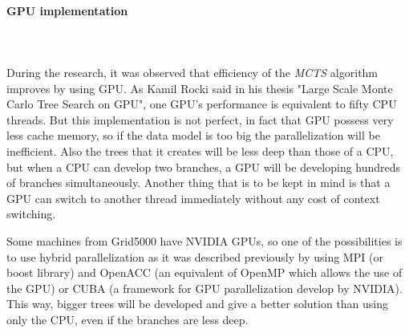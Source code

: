 \paragraph{GPU implementation}\mbox{}\\\mbox{}\\
During the research, it was observed that efficiency of the \emph{MCTS} algorithm improves by using GPU. As Kamil Rocki said in his thesis "Large Scale Monte Carlo Tree Search on GPU"\cite{GPU}, one GPU's performance is equivalent to fifty CPU threads. But this implementation is not perfect, in fact that GPU possess very less cache memory, so if the data model is too big the parallelization will be inefficient. Also the trees that it creates will be less deep than those of a CPU, but when a CPU can develop two branches, a GPU will be developing hundreds of branches simultaneously. Another thing that is to be kept in mind is that a GPU can switch to another thread immediately without any cost of context switching. 

Some machines from Grid5000 have NVIDIA GPUs, so one of the possibilities is to use hybrid parallelization as it was described previously by using MPI (or boost library) and OpenACC (an equivalent of OpenMP which allows the use of the GPU) or CUBA (a framework for GPU parallelization develop by NVIDIA). This way, bigger trees will be developed and give a better solution than using only the CPU, even if the branches are less deep.